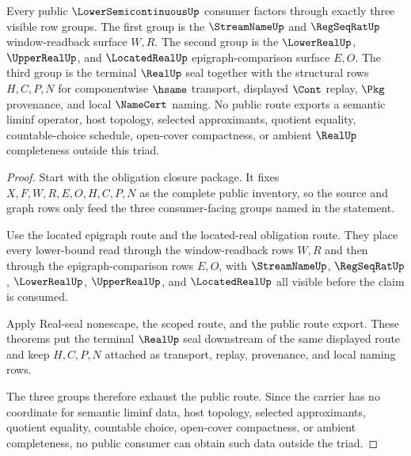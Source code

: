 \begin{theorem}
\label{thm:lower-semicontinuous-public-route-exactness-triad}
Every public $\LowerSemicontinuousUp$ consumer factors through exactly three visible row groups. The first group is the $\StreamNameUp$ and $\RegSeqRatUp$ window-readback surface $W,R$. The second group is the $\LowerRealUp$, $\UpperRealUp$, and $\LocatedRealUp$ epigraph-comparison surface $E,O$. The third group is the terminal $\RealUp$ seal together with the structural rows $H,C,P,N$ for componentwise $\hsame$ transport, displayed $\Cont$ replay, $\Pkg$ provenance, and local $\NameCert$ naming. No public route exports a semantic liminf operator, host topology, selected approximants, quotient equality, countable-choice schedule, open-cover compactness, or ambient $\RealUp$ completeness outside this triad.
\end{theorem}
\begin{proof}
Start with the obligation closure package. It fixes $X,F,W,R,E,O,H,C,P,N$ as the complete public inventory, so the source and graph rows only feed the three consumer-facing groups named in the statement.

Use the located epigraph route and the located-real obligation route. They place every lower-bound read through the window-readback rows $W,R$ and then through the epigraph-comparison rows $E,O$, with $\StreamNameUp$, $\RegSeqRatUp$, $\LowerRealUp$, $\UpperRealUp$, and $\LocatedRealUp$ all visible before the claim is consumed.

Apply Real-seal nonescape, the scoped route, and the public route export. These theorems put the terminal $\RealUp$ seal downstream of the same displayed route and keep $H,C,P,N$ attached as transport, replay, provenance, and local naming rows.

The three groups therefore exhaust the public route. Since the carrier has no coordinate for semantic liminf data, host topology, selected approximants, quotient equality, countable choice, open-cover compactness, or ambient completeness, no public consumer can obtain such data outside the triad.
\end{proof}
